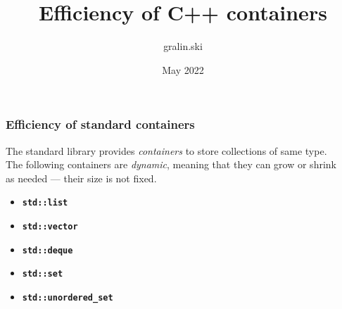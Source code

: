 \documentclass[aspectratio=169]{beamer}
\title[%
\texttt{\textcolor{clGray}{C++ Friends} %
\textcolor{clCodeBlue}{\#20}\textcolor{clGray}{~::~}\textcolor{clCodeBlue}{EfficiencyOfContainers}}%
]{%
Efficiency of C++ containers%
}
\author{gralin.ski}
\date{May 2022}
\newcommand{\greenemph}[1]{\textit{\textcolor{clGreen}{#1}}}
\newcommand{\cpp}[1]{\texttt{\textbf{\textcolor{clCodeBlue}{#1}}}}
\begin{document}
{
\begin{frame}
\titlepage{}
\end{frame}
}

\begin{frame}
\frametitle{Efficiency of standard containers}
The standard library provides \textit{containers} to store collections of same type.\\
\vspace*{12pt}
The following containers are \greenemph{dynamic}, meaning that they can grow or shrink\\
as needed --- their size is not fixed.
\vspace*{18pt}
\begin{center}
  \begin{minipage}{0.4\textwidth}
    \begin{itemize}
      \item{} \cpp{std::list}
      \item{} \cpp{std::vector}
      \item{} \cpp{std::deque}
      \item{} \cpp{std::set}
      \item{} \cpp{std::unordered\_set}
    \end{itemize}
  \end{minipage}
\end{center}
\end{frame}
\end{document}

